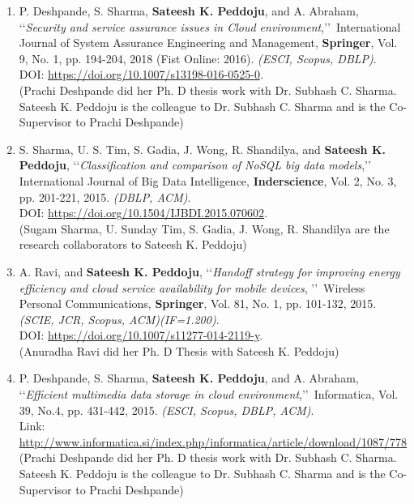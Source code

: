 \begin{enumerate}
	\item
	P. Deshpande, S. Sharma, \textbf{Sateesh K. Peddoju}, and A. Abraham, \lq\lq \textit{Security and service assurance issues in Cloud environment},\rq\rq\, International Journal of System Assurance Engineering and Management, \textbf{Springer}, Vol. 9, No. 1, pp. 194-204, 2018 (Fist Online: 2016). \emph{(ESCI, Scopus, DBLP)}. \\DOI: \url{https://doi.org/10.1007/s13198-016-0525-0}.  \\(Prachi Deshpande did her Ph. D thesis work with Dr. Subhash C. Sharma. Sateesh K. Peddoju is the colleague to Dr. Subhash C. Sharma and is the Co-Supervisor to Prachi Deshpande)
	
	\item
	S. Sharma, U. S. Tim, S. Gadia, J. Wong, R. Shandilya, and \textbf{Sateesh K. Peddoju}, \lq\lq \textit{Classification and comparison of NoSQL big data models},\rq\rq\, International Journal of Big Data Intelligence, \textbf{Inderscience}, Vol. 2, No. 3, pp. 201-221, 2015. \emph{(DBLP, ACM)}. \\DOI: \url{https://doi.org/10.1504/IJBDI.2015.070602}.
\\(Sugam Sharma, U. Sunday Tim, S. Gadia, J. Wong, R. Shandilya are the research collaborators to Sateesh K. Peddoju)	
	
	\item
	A. Ravi, and \textbf{Sateesh K. Peddoju}, \lq\lq \textit{Handoff strategy for improving energy efficiency and cloud service availability for mobile devices}, \rq\rq\, Wireless Personal Communications, \textbf{Springer}, Vol. 81, No. 1, pp. 101-132, 2015. \emph{(SCIE, JCR, Scopus, ACM)(IF=1.200)}. \\DOI: \url{https://doi.org/10.1007/s11277-014-2119-y}. \\(Anuradha Ravi did her Ph. D Thesis with Sateesh K. Peddoju)
	
	
	\item
	P. Deshpande, S. Sharma, \textbf{Sateesh K. Peddoju}, and A. Abraham, \lq\lq \textit{Efficient multimedia data storage in cloud environment},\rq\rq\, Informatica, Vol. 39, No.4, pp. 431-442, 2015. \emph{(ESCI, Scopus, DBLP, ACM)}. \\Link: \url{http://www.informatica.si/index.php/informatica/article/download/1087/778} \\(Prachi Deshpande did her Ph. D thesis work with Dr. Subhash C. Sharma. Sateesh K. Peddoju is the colleague to Dr. Subhash C. Sharma and is the Co-Supervisor to Prachi Deshpande)
	

\end{enumerate}
